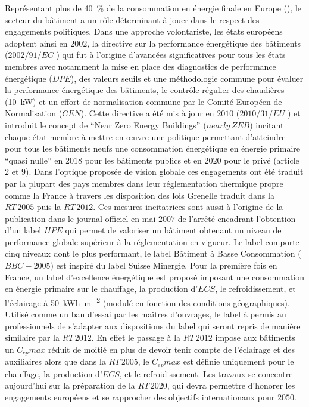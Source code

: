Représentant plus de \SI{40}{\percent} de la consommation en énergie
finale en Europe (), le secteur du bâtiment a un rôle déterminant à
jouer dans le respect des engagements politiques. Dans une approche volontariste,
les états européens adoptent ainsi en $2002$, la directive sur la performance énergétique des bâtiments
($2002/91/EC$ ) qui fut à l’origine
d’avancées significatives pour tous les états membres avec notamment la mise en place
des diagnostics de performance énergétique ($DPE$), des valeurs seuils et une méthodologie commune
pour évaluer la performance énergétique des bâtiments, le contrôle régulier des chaudières (\SI{+10}{kW})
et un effort de normalisation commune par le Comité Européen de Normalisation ($CEN$).
Cette directive a été mis à jour en $2010$ ($2010/31/EU$ \textcite{EPBD2010}) et introduit le concept
de \enquote{Near Zero Energy Buildings} ($nearly\,ZEB$) incitant chaque état membre à mettre
en œuvre une politique permettant d’atteindre pour tous les bâtiments neufs une consommation
énergétique en énergie primaire \enquote{quasi nulle} en $2018$ pour les bâtiments
publics et en $2020$ pour le privé (article $2$ et $9$).
Dans l’optique proposée de vision globale
ces engagements ont été traduit par la plupart des pays membres dans leur réglementation
thermique propre comme la France à travers les disposition des lois Grenelle traduit dans
la $RT\,2005$ puis la $RT\,2012$.
Ces mesures incitatrices sont aussi à l’origine de la publication dans le journal officiel
en mai $2007$ de l’arrêté encadrant l’obtention d’un label $HPE$ qui permet de valoriser
un bâtiment obtenant un niveau de performance globale supérieur à la réglementation en
vigueur. Le label comporte cinq niveaux dont le plus performant, le label Bâtiment à
Basse Consommation (\href{https://www.effinergie.org/web/index.php/les-labels-effinergie/bbc-effinergie}{$BBC-2005$})
est inspiré du label Suisse Minergie. Pour la première fois en France, un
label d’excellence énergétique est proposé imposant une consommation en énergie primaire
sur le chauffage, la production d’$ECS$, le refroidissement, et l’éclairage à
\SI{50}{kWh\per\metre\squared} (modulé en fonction des conditions géographiques).
Utilisé comme un ban d’essai par les maîtres d’ouvrages, le label à permis au professionnels
de s’adapter aux dispositions du label qui seront repris de manière similaire par la
$RT\,2012$. En effet le passage à la $RT\,2012$ impose aux bâtiments un $C_{ep} max$ réduit
de moitié en plus de devoir tenir compte de l’éclairage et des auxiliaires alors que
dans la $RT\,2005$, le $C_{ep} max$ est définie uniquement pour le chauffage, la production
d’$ECS$, et le refroidissement.
Les travaux se concentre aujourd’hui sur la préparation de la $RT\,2020$, qui devra
permettre d’honorer les engagements européens et se rapprocher des objectifs internationaux
pour $2050$.


